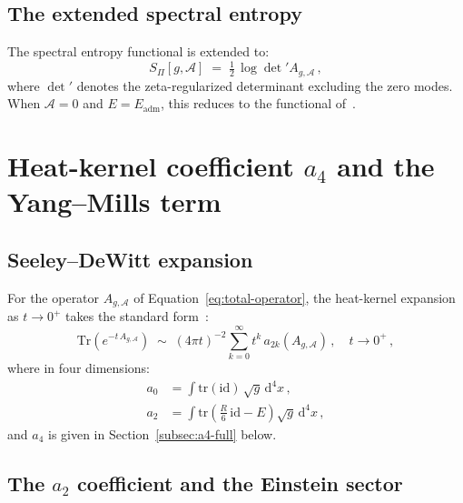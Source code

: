 \documentclass[12pt,a4paper]{article}
\theoremstyle{remark}
\theoremstyle{plain}
\theoremstyle{definition}
\begin{document}
    \subsection{The extended spectral entropy}
      \label{subsec:extended-entropy}

      The spectral entropy functional is extended to:
      \begin{equation}\label{eq:extended-entropy}
        S_\Pi[g, \mathcal{A}]
        \;=\;
        \tfrac{1}{2}\,\log\det'\! A_{g,\mathcal{A}}\,,
      \end{equation}
      where $\det'$ denotes the zeta-regularized determinant
      excluding the zero modes.
      When $\mathcal{A} = 0$ and $E = E_{\mathrm{adm}}$,
      this reduces to the functional of~\cite{Beau2026h}.

  \section{Heat-kernel coefficient \(a_4\) and the Yang--Mills term}
    \label{sec:a4}

    \subsection{Seeley--DeWitt expansion}
      \label{subsec:sdw-expansion}

      For the operator $A_{g,\mathcal{A}}$ of
      Equation~\eqref{eq:total-operator}, the heat-kernel
      expansion as $t \to 0^+$ takes the standard
      form~\cite{Vassilevich2003,ParkerToms2009}:
      \begin{equation}\label{eq:heat-kernel-expansion}
        \mathrm{Tr}\!\left(e^{-t\,A_{g,\mathcal{A}}}\right)
        \;\sim\;
        (4\pi t)^{-2}
        \sum_{k=0}^{\infty} t^k\, a_{2k}(A_{g,\mathcal{A}})\,,
        \quad
        t \to 0^+\,,
      \end{equation}
      where in four dimensions:
      \begin{align}
        a_0
        &= \int \mathrm{tr}(\mathrm{id})\,\sqrt{g}\,\mathrm{d}^4 x\,,
        \label{eq:a0} \\
        a_2
        &= \int \mathrm{tr}\!\left(
                               \frac{R}{6}\,\mathrm{id} - E
        \right)\sqrt{g}\,\mathrm{d}^4 x\,,
        \label{eq:a2}
      \end{align}
      and $a_4$ is given in
      Section~\ref{subsec:a4-full} below.

    \subsection{The \texorpdfstring{$a_2$}{a2} coefficient
    and the Einstein sector}
      \label{subsec:a2-einstein}
\end{document}
